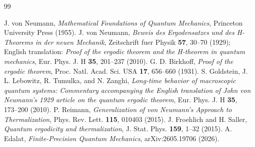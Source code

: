 \documentclass[11pt, onecolumn]{article}
\begin{document}
\begin{thebibliography}{99}

J. von Neumann, \textit{Mathematical Foundations of Quantum Mechanics}, Princeton University Press (1955).
J. von Neumann, \textit{Beweis des Ergodensatzes und des H-Theorems in der neuen Mechanik}, Zeitschrift fuer Physik \textbf{57}, 30--70 (1929); English translation: \textit{Proof of the ergodic theorem and the H-theorem in quantum mechanics}, Eur. Phys. J. H \textbf{35}, 201--237 (2010).
G. D. Birkhoff, \textit{Proof of the ergodic theorem}, Proc. Natl. Acad. Sci. USA \textbf{17}, 656--660 (1931).
S. Goldstein, J. L. Lebowitz, R. Tumulka, and N. Zanghi, \textit{Long-time behavior of macroscopic quantum systems: Commentary accompanying the English translation of John von Neumann's 1929 article on the quantum ergodic theorem}, Eur. Phys. J. H \textbf{35}, 173--200 (2010).
P. Reimann, \textit{Generalization of von Neumann's Approach to Thermalization}, Phys. Rev. Lett. \textbf{115}, 010403 (2015).
J. Froehlich and H. Saller, \textit{Quantum ergodicity and thermalization}, J. Stat. Phys. \textbf{159}, 1--32 (2015).
A. Edalat, \textit{Finite-Precision Quantum Mechanics}, arXiv:2605.19706 (2026).
\end{thebibliography}
\end{document}
